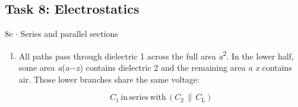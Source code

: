 \documentclass[11pt]{article}
\begin{document}
\begin{keepsection}\subsection{Task 8: Electrostatics}

\begin{workedbox}{8e \ensuremath{\cdot} Series and parallel sections}
\begin{enumerate}
\item {}
All paths pass through dielectric 1 across the full area \textit{a}\textsuperscript{2}. In the lower half, some area \textit{a}(\textit{a}\ensuremath{-}\textit{x}) contains dielectric 2 and the remaining area \textit{a x} contains air. Those lower branches share the same voltage:

\begin{equation*}{C}_{1}\, \text{in}\, \text{series}\, \text{with}\, ({C}_{2}\, ∥\, {C}_{\mathrm{L}})\end{equation*}


\end{enumerate}
\end{workedbox}
\end{keepsection}
\end{document}
